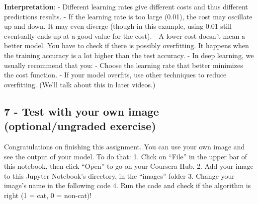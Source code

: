 \documentclass[11pt]{article}
\begin{document}
    \textbf{Interpretation}: - Different learning rates give different costs
and thus different predictions results. - If the learning rate is too
large (0.01), the cost may oscillate up and down. It may even diverge
(though in this example, using 0.01 still eventually ends up at a good
value for the cost). - A lower cost doesn't mean a better model. You
have to check if there is possibly overfitting. It happens when the
training accuracy is a lot higher than the test accuracy. - In deep
learning, we usually recommend that you: - Choose the learning rate that
better minimizes the cost function. - If your model overfits, use other
techniques to reduce overfitting. (We'll talk about this in later
videos.)

    \subsection{7 - Test with your own image (optional/ungraded
exercise)}\label{test-with-your-own-image-optionalungraded-exercise}

Congratulations on finishing this assignment. You can use your own image
and see the output of your model. To do that: 1. Click on ``File'' in
the upper bar of this notebook, then click ``Open'' to go on your
Coursera Hub. 2. Add your image to this Jupyter Notebook's directory, in
the ``images'' folder 3. Change your image's name in the following code
4. Run the code and check if the algorithm is right (1 = cat, 0 =
non-cat)!
\end{document}
